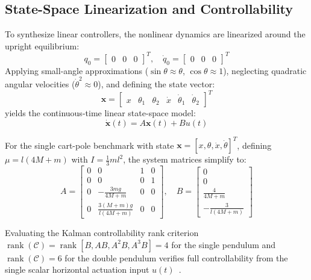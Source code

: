 \documentclass[conference]{IEEEtran}
\begin{document}
\subsection{State-Space Linearization and Controllability}
To synthesize linear controllers, the nonlinear dynamics are linearized around the upright equilibrium:
\begin{equation}
q_0 = \begin{bmatrix} 0 & 0 & 0 \end{bmatrix}^T, \quad \dot{q}_0 = \begin{bmatrix} 0 & 0 & 0 \end{bmatrix}^T
\end{equation}
Applying small-angle approximations ($\sin\theta \approx \theta$, $\cos\theta \approx 1$), neglecting quadratic angular velocities ($\dot{\theta}^2 \approx 0$), and defining the state vector:
\begin{equation}
\mathbf{x} = \begin{bmatrix} x & \theta_1 & \theta_2 & \dot{x} & \dot{\theta}_1 & \dot{\theta}_2 \end{bmatrix}^T
\end{equation}
yields the continuous-time linear state-space model:
\begin{equation}
\dot{\mathbf{x}}(t) = A\mathbf{x}(t) + B u(t)
\label{eq:lin_ss}
\end{equation}

For the single cart-pole benchmark with state $\mathbf{x} = [x, \theta, \dot{x}, \dot{\theta}]^T$, defining $\mu = l(4M + m)$ with $I = \frac{1}{3}ml^2$, the system matrices simplify to:
\begin{equation}
A = \begin{bmatrix}
0 & 0 & 1 & 0 \\
0 & 0 & 0 & 1 \\
0 & -\frac{3mg}{4M + m} & 0 & 0 \\
0 & \frac{3(M + m)g}{l(4M + m)} & 0 & 0
\end{bmatrix}, \quad
B = \begin{bmatrix}
0 \\ 0 \\ \frac{4}{4M + m} \\ -\frac{3}{l(4M + m)}
\end{bmatrix}
\end{equation}

Evaluating the Kalman controllability rank criterion $\operatorname{rank}(\mathcal{C}) = \operatorname{rank}[B, AB, A^2B, A^3B] = 4$ for the single pendulum and $\operatorname{rank}(\mathcal{C}) = 6$ for the double pendulum verifies full controllability from the single scalar horizontal actuation input $u(t)$~\cite{ref_git}.
\end{document}

